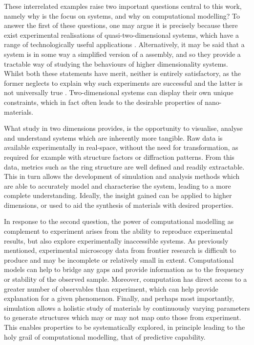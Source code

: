 These interrelated examples raise two important questions central to this work, namely why is the focus on \td{} systems, and why on computational modelling?
To answer the first of these questions, one may argue it is precisely because there exist experimental realisations of quasi\--two\--dimensional systems, which have a range of technologically useful applications \cite{Butler2013,Bhimanapati2015,Tan2017}.
Alternatively, it may be said that a \td{} system is in some way a simplified version of a \thd{} assembly, and so they provide a tractable way of studying the behaviours of higher dimensionality systems.
Whilst both these statements have merit, neither is entirely satisfactory, as the former neglects to explain why such experiments are successful and the latter is not universally true \cite{ChaikinPaulM1995}.
Two\--dimensional systems can display their own unique constraints, which in fact often leads to the desirable properties of nano\--materials.

What study in two dimensions provides, is the opportunity to visualise, analyse and understand systems which are inherently more tangible.
Raw data is available experimentally in real\--space, without the need for transformation, as required for example with structure factors or diffraction patterns.
From this data, metrics such as the ring structure are well defined and readily extractable.
This in turn allows the development of simulation and analysis methods which are able to accurately model and characterise the system, leading to a more complete understanding.
Ideally, the insight gained can be applied to higher dimensions, or used to aid the synthesis of materials with desired properties.

In response to the second question, the power of computational modelling as complement to experiment arises from the ability to reproduce experimental results, but also explore experimentally inaccessible systems.
As previously mentioned, experimental microscopy data from frontier research is difficult to produce and may be incomplete or relatively small in extent.
Computational models can help to bridge any gaps and provide information as to the frequency or stability of the observed sample.
Moreover, computation has direct access to a greater number of observables than experiment, which can help provide explanation for a given phenomenon.
Finally, and perhaps most importantly, simulation allows a holistic study of materials by continuously varying parameters to generate structures which may or may not map onto those from experiment.
This enables properties to be systematically explored, in principle leading to the holy grail of computational modelling, that of predictive capability.

